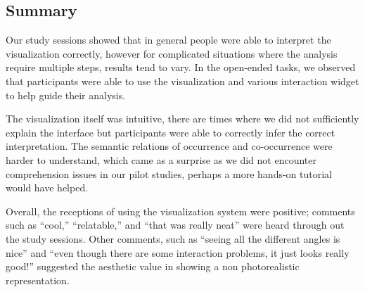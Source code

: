   
\subsection{Summary}
Our study sessions showed that in general people were able to interpret the
visualization correctly, however for complicated situations where the analysis
require multiple steps, results tend to vary. In the open-ended tasks, we
observed that participants were able to use the visualization and various
interaction widget to help guide their analysis.

The visualization itself was intuitive, there are times where we did not
sufficiently explain the interface but participants were able to correctly infer
the correct interpretation. The semantic relations of occurrence and
co-occurrence were harder to understand, which came as a surprise as we did not
encounter comprehension issues in our pilot studies, perhaps a more hands-on
tutorial would have helped.

Overall, the receptions of using the visualization system were positive;
comments such as ``cool,'' ``relatable,'' and ``that was really neat'' were heard
through out the study sessions. Other comments, such as ``seeing all the different angles is
nice'' and ``even though there are some interaction problems, it just looks
really good!'' suggested the aesthetic value in showing a non photorealistic \threed
representation.  
  